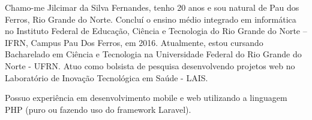 

\begin{cvparagraph}

Chamo-me Jilcimar da Silva Fernandes, tenho 20 anos e sou natural de Pau dos Ferros, Rio Grande do Norte. Concluí o ensino médio integrado em informática no Instituto Federal de Educação, Ciência e Tecnologia do Rio Grande do Norte – IFRN, Campus Pau Dos Ferros, em 2016. Atualmente, estou cursando Bacharelado em Ciência e Tecnologia na Universidade Federal do Rio Grande do Norte - UFRN. Atuo como bolsista de pesquisa desenvolvendo projetos web no Laboratório de Inovação Tecnológica em Saúde - LAIS.

Possuo experiência em desenvolvimento mobile e web utilizando a linguagem PHP (puro ou fazendo uso do framework Laravel).
\end{cvparagraph}
